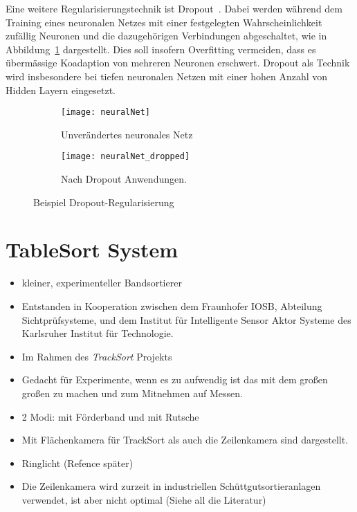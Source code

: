 Eine weitere Regularisierungstechnik ist Dropout~\cite{JMLR:v15:srivastava14a}.
Dabei werden während dem Training eines neuronalen Netzes 
mit einer festgelegten Wahrscheinlichkeit zufällig Neuronen und die dazugehörigen Verbindungen abgeschaltet, 
wie in Abbildung~\ref{fig:dropout} dargestellt.
Dies soll insofern Overfitting vermeiden, dass es übermässige Koadaption von mehreren Neuronen erschwert.
Dropout als Technik wird insbesondere bei tiefen neuronalen Netzen mit einer hohen Anzahl von Hidden Layern eingesetzt. 

\begin{figure}[h]
    \centering
    \begin{subfigure}[t]{0.4\textwidth}
		\texttt{[image: neuralNet]}
		\caption{Unverändertes neuronales Netz}
    \end{subfigure}
    \begin{subfigure}[t]{0.4\textwidth}
		\texttt{[image: neuralNet\_dropped]}
		\caption{Nach Dropout Anwendungen.}
	\end{subfigure}
    \caption{Beispiel Dropout-Regularisierung~\cite{JMLR:v15:srivastava14a}}
    \label{fig:dropout}
\end{figure}


\section{TableSort System}

\color{blue}

\begin{itemize}
	\item kleiner, experimenteller Bandsortierer~\cite{doll2015}
	\item Entstanden in Kooperation zwischen dem Fraunhofer IOSB, Abteilung Sichtprüfsysteme, und dem Institut für Intelligente Sensor Aktor Systeme des Karlsruher Institut für Technologie.
	\item Im Rahmen des \textit{TrackSort} Projekts
	\item Gedacht für Experimente, wenn es zu aufwendig ist das mit dem großen großen zu machen und zum Mitnehmen auf Messen.
	\item 2 Modi: mit Förderband und mit Rutsche
	\item Mit Flächenkamera für TrackSort als auch die Zeilenkamera sind dargestellt.
	\item Ringlicht (Refence später)
	\item Die Zeilenkamera wird zurzeit in industriellen Schüttgutsortieranlagen verwendet, ist aber nicht optimal (Siehe all die Literatur)
\end{itemize}
\color{black}


